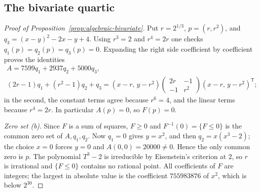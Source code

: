 \subsection{The bivariate quartic}
\label{app:algebraic-bivariate}

\begin{proof}[Proof of Proposition~\ref{prop:algebraic-bivariate}]
Put $r=2^{1/3}$, $p=(r,r^2)$, and $q_3=(x-y)^2-2x-y+4$. Using $r^3=2$ and
$r^4=2r$ one checks $q_1(p)=q_2(p)=q_3(p)=0$. Expanding the right side
coefficient by coefficient proves the identities
\begin{equation}
\begin{gathered}
 A=7599q_1+2937q_2+5000q_3,\\
 (2r-1)q_1+(r^2-1)q_2+q_3
  =(x-r,\,y-r^2)\begin{pmatrix}2r&-1\\-1&r^2\end{pmatrix}
   (x-r,\,y-r^2)^{\mathsf T};
\end{gathered}
 \label{eq:algebraic-bivariate-expose}
\end{equation}
in the second, the constant terms agree because $r^6=4$, and the linear terms
because $r^4=2r$. In particular $A(p)=0$, so $F(p)=0$.

\emph{Zero set (b).} Since $F$ is a sum of squares, $F\ge0$ and
$F^{-1}(0)=\{F\le0\}$ is the common zero set of $A,q_1,q_2$. Now $q_1=0$
gives $y=x^2$, and then $q_2=x(x^3-2)$; the choice $x=0$ forces $y=0$ and
$A(0,0)=20000\ne0$. Hence the only common zero is $p$. The polynomial $T^3-2$
is irreducible by Eisenstein's criterion at $2$, so $r$ is irrational and
$\{F\le0\}$ contains no rational point. All coefficients of $F$ are integers;
the largest in absolute value is the coefficient $755983876$ of $x^2$, which
is below $2^{30}$.


\end{proof}
